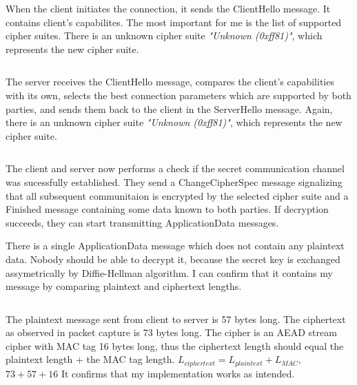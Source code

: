 When the client initiates the connection, it sends the ClientHello message. It contains client's capabilites. The most important for me is the list of supported cipher suites. There is an unknown cipher suite \textit{"Unknown (0xff81)"}, which represents the new cipher suite.

\inputminted{text}{code/packet-client-hello.txt}

The server receives the ClientHello message, compares the client's capabilities with its own, selects the best connection parameters which are supported by both parties, and sends them back to the client in the ServerHello message. Again, there is an unknown cipher suite \textit{"Unknown (0xff81)"}, which represents the new cipher suite.

\inputminted{text}{code/packet-server-hello.txt}

The client and server now performs a check if the secret communication channel was sucessfully established. They send a ChangeCipherSpec message signalizing that all subsequent communitaion is encrypted by the selected cipher suite and a Finished message containing some data known to both parties. If decryption succeeds, they can start transmitting ApplicationData messages.

There is a single ApplicationData message which does not contain any plaintext data. Nobody should be able to decrypt it, because the secret key is exchanged assymetrically by Diffie-Hellman algorithm. I can confirm that it contains my message by comparing plaintext and ciphertext lengths.

\inputminted{text}{code/packet-data.txt}

The plaintext message sent from client to server is 57 bytes long. The ciphertext as observed in packet capture is 73 bytes long. The cipher is an AEAD stream cipher with MAC tag 16 bytes long, thus the ciphertext length should equal the plaintext length + the MAC tag length. $L_{ciphertext} = L_{plaintext} + L_{MAC}$, $73 + 57 + 16$ It confirms that my implementation works as intended.
